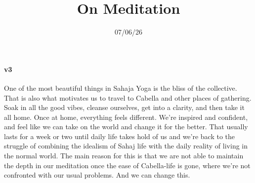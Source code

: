 \documentclass[12pt]{article}
\title{On Meditation}
\date{07/06/26}
\begin{document}
\maketitle


\paragraph{v3}


One of the most beautiful things in Sahaja Yoga is the bliss of the collective.
That is also what motivates us to travel to Cabella and other places of gathering.
Soak in all the good vibes, cleanse ourselves, get into a clarity, and then take it all home.
Once at home, everything feels different.
We're inspired and confident, and feel like we can take on the world and change it for the better.
That usually lasts for a week or two until daily life takes hold of us and we're back to the struggle of combining the idealism of Sahaj life with the daily reality of living in the normal world.
The main reason for this is that we are not able to maintain the depth in our meditation once the ease of Cabella-life is gone, where we're not confronted with our usual problems.
And we can change this.
\end{document}
